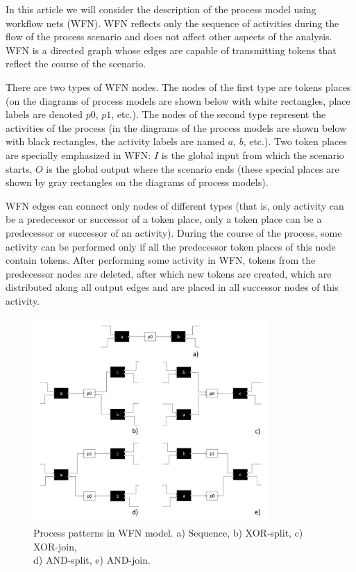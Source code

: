 \documentclass[
11pt,%
tightenlines,%
twoside,%
onecolumn,%
nofloats,%
nobibnotes,%
nofootinbib,%
superscriptaddress,%
noshowpacs,%
centertags]%
{revtex4}
\begin{document}
In this article we will consider the description of the process model using workflow nets (WFN).
WFN reflects only the sequence of activities during the flow of the process scenario and does not affect other aspects of the analysis.
WFN is a directed graph whose edges are capable of transmitting tokens that reflect the course of the scenario.

There are two types of WFN nodes.
The nodes of the first type are tokens places (on the diagrams of process models are shown below with white rectangles, place labels are denoted $p0$, $p1$, etc.).
The nodes of the second type represent the activities of the process (in the diagrams of the process models are shown below with black rectangles, the activity labels are named $a$, $b$, etc.).
Two token places are specially emphasized in WFN: $I$ is the global input from which the scenario starts, $O$ is the global output where the scenario ends (these special places are shown by gray rectangles on the diagrams of process models).

WFN edges can connect only nodes of different types (that is, only activity can be a predecessor or successor of a token place, only a token place can be a predecessor or successor of an activity).
During the course of the process, some activity can be performed only if all the predecessor token places of this node contain tokens.
After performing some activity in WFN, tokens from the predecessor nodes are deleted, after which new tokens are created, which are distributed along all output edges and are placed in all successor nodes of this activity.

\begin{figure}[h]
\setcaptionmargin{5mm}
\onelinecaptionsfalse %
\includegraphics[width=0.8\textwidth]{pics/wfn-patterns.pdf}
\caption{Process patterns in WFN model. a) Sequence, b) XOR-split, c) XOR-join,\\d) AND-split, e) AND-join.}
\label{fig:wfn-patterns}
\end{figure}
\end{document}
